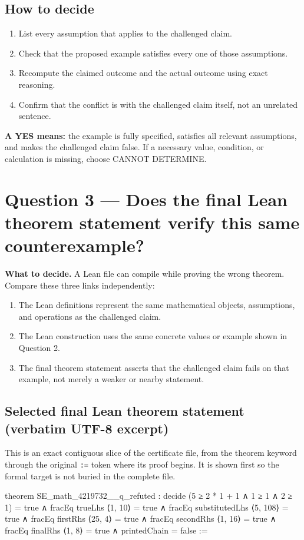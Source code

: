 \documentclass[11pt]{article}
\begin{document}
\subsection*{How to decide}
\begin{enumerate}
\item List every assumption that applies to the challenged claim.
\item Check that the proposed example satisfies every one of those assumptions.
\item Recompute the claimed outcome and the actual outcome using exact reasoning.
\item Confirm that the conflict is with the challenged claim itself, not an unrelated sentence.
\end{enumerate}
\textbf{A YES means:} the example is fully specified, satisfies all relevant assumptions, and makes the challenged claim false. If a necessary value, condition, or calculation is missing, choose CANNOT DETERMINE.
\section*{Question 3 --- Does the final Lean theorem statement verify this same counterexample?}
\textbf{What to decide.} A Lean file can compile while proving the wrong theorem. Compare these three links independently:
\begin{enumerate}
\item The Lean definitions represent the same mathematical objects, assumptions, and operations as the challenged claim.
\item The Lean construction uses the same concrete values or example shown in Question 2.
\item The final theorem statement asserts that the challenged claim fails on that example, not merely a weaker or nearby statement.
\end{enumerate}
\subsection*{Selected final Lean theorem statement (verbatim UTF-8 excerpt)}
This is an exact contiguous slice of the certificate file, from the theorem keyword through the original \texttt{:=} token where its proof begins. It is shown first so the formal target is not buried in the complete file.
\begin{Vlean}
theorem SE_math_4219732__q_refuted :
    decide (5 ≥ 2 * 1 + 1 ∧ 1 ≥ 1 ∧ 2 ≥ 1) = true
    ∧ fracEq trueLhs ⟨1, 10⟩ = true
    ∧ fracEq substitutedLhs ⟨5, 108⟩ = true
    ∧ fracEq firstRhs ⟨25, 4⟩ = true
    ∧ fracEq secondRhs ⟨1, 16⟩ = true
    ∧ fracEq finalRhs ⟨1, 8⟩ = true
    ∧ printedChain = false :=
\end{Vlean}
\end{document}
